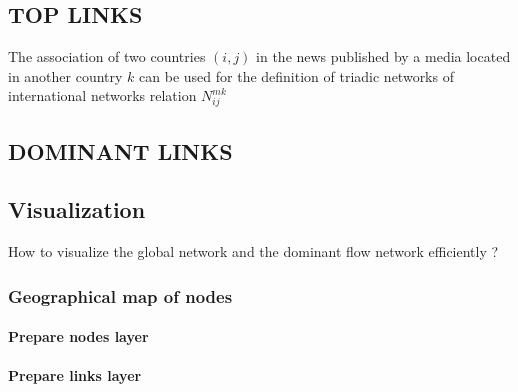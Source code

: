 \documentclass[
]{article}
\begin{document}
\hypertarget{top-links}{%
\subsection{TOP LINKS}\label{top-links}}

The association of two countries \((i,j)\) in the news published by a
media located in another country \(k\) can be used for the definition of
triadic networks of international networks relation \(N_{ij}^{mk}\)

\hypertarget{dominant-links}{%
\subsection{DOMINANT LINKS}\label{dominant-links}}

\hypertarget{visualization}{%
\subsection{Visualization}\label{visualization}}

How to visualize the global network and the dominant flow network
efficiently ?

\hypertarget{geographical-map-of-nodes}{%
\subsubsection{Geographical map of
nodes}\label{geographical-map-of-nodes}}

\hypertarget{prepare-nodes-layer}{%
\paragraph{Prepare nodes layer}\label{prepare-nodes-layer}}

\hypertarget{prepare-links-layer}{%
\paragraph{Prepare links layer}\label{prepare-links-layer}}
\end{document}
